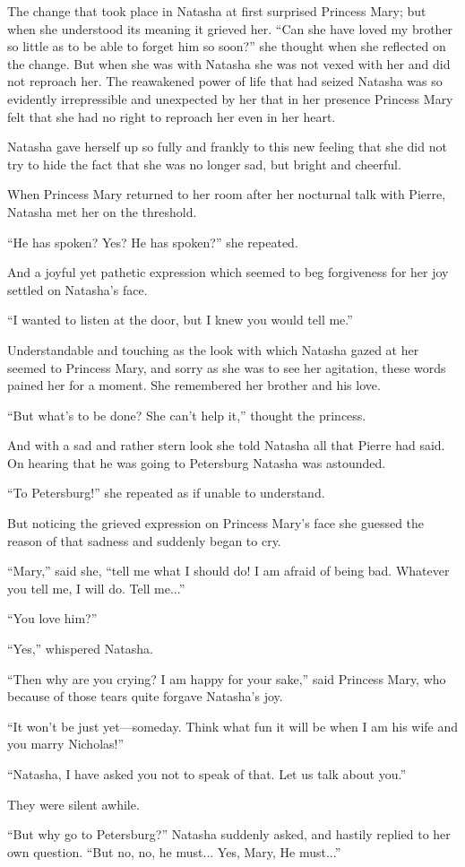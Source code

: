 The change that took place in Natasha at first surprised Princess
Mary; but when she understood its meaning it grieved her. ``Can
she have loved my brother so little as to be able to forget him
so soon?'' she thought when she reflected on the change. But when
she was with Natasha she was not vexed with her and did not
reproach her. The reawakened power of life that had seized
Natasha was so evidently irrepressible and unexpected by her that
in her presence Princess Mary felt that she had no right to
reproach her even in her heart.

Natasha gave herself up so fully and frankly to this new feeling
that she did not try to hide the fact that she was no longer sad,
but bright and cheerful.

When Princess Mary returned to her room after her nocturnal talk
with Pierre, Natasha met her on the threshold.

``He has spoken? Yes? He has spoken?'' she repeated.

And a joyful yet pathetic expression which seemed to beg
forgiveness for her joy settled on Natasha's face.

``I wanted to listen at the door, but I knew you would tell me.''

Understandable and touching as the look with which Natasha gazed
at her seemed to Princess Mary, and sorry as she was to see her
agitation, these words pained her for a moment. She remembered
her brother and his love.

``But what's to be done? She can't help it,'' thought the
princess.

And with a sad and rather stern look she told Natasha all that
Pierre had said. On hearing that he was going to Petersburg
Natasha was astounded.

``To Petersburg!'' she repeated as if unable to understand.

But noticing the grieved expression on Princess Mary's face she
guessed the reason of that sadness and suddenly began to cry.

``Mary,'' said she, ``tell me what I should do! I am afraid of
being bad.  Whatever you tell me, I will do. Tell me...''

``You love him?''

``Yes,'' whispered Natasha.

``Then why are you crying? I am happy for your sake,'' said
Princess Mary, who because of those tears quite forgave Natasha's
joy.

``It won't be just yet---someday. Think what fun it will be when
I am his wife and you marry Nicholas!''

``Natasha, I have asked you not to speak of that. Let us talk
about you.''

They were silent awhile.

``But why go to Petersburg?'' Natasha suddenly asked, and hastily
replied to her own question. ``But no, no, he must... Yes, Mary,
He must...''
